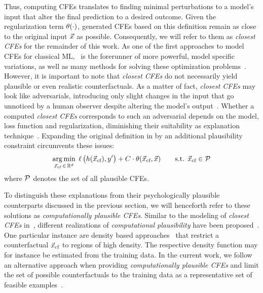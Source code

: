 Thus, computing \glspl{CFE} translates to finding minimal perturbations to a model's input that alter the final prediction to a desired outcome. Given the regularization term $\operatorname*{{\theta}}(\cdot)$, generated \glspl{CFE} based on this definition remain as close to the original input $\vec{x}$ as possible. Consequently, we will refer to them as \textit{closest \glspl{CFE}} for the remainder of this work.
As one of the first approaches to model \glspl{CFE} for classical \gls{ML},~ is the 
forerunner of more powerful, model specific variations, as well as many methods for solving these optimization problems~\citep{verma_counterfactual_2020,artelt_computation_2019,karimi_survey_2020}.
However, it is important to note that \textit{closest \glspl{CFE}} do not necessarily yield plausible or even realistic counterfactuals.
As a matter of fact, \textit{closest \glspl{CFE}} may look like adversarials, introducing only slight changes in the input that go unnoticed by a human observer despite altering the model's output~\citep{papernot_practical_2017}. 
Whether a computed \textit{closest \glspl{CFE}} corresponds to such an adversarial depends on the model, loss function and regularization, diminishing their suitability as explanation technique~\citep{laugel_issues_2019}.
Expanding the original definition in  by an additional plausibility constraint circumvents these issues:
\begin{equation}
\begin{split}
\underset{{\vec{x}_{\text{cf}}} \,\in\, \mathbb{R}^d}{\arg\min}\; \operatorname*{{\ell}}\big(h({\vec{x}_{\text{cf}}}), y'\big) + C \cdot \operatorname*{{\theta}}({\vec{x}_{\text{cf}}}, \vec{x}) \quad\quad \text{s.t. } {\vec{x}_{\text{cf}}} \in \mathcal{P}
\end{split}
\end{equation}
where $\mathcal{P}$ denotes the set of all plausible \glspl{CFE}.

To distinguish these explanations from their psychologically plausible counterparts discussed in the previous section, we will henceforth refer to these solutions as \textit{computationally plausible \glspl{CFE}}.
Similar to the modeling of \textit{closest \glspl{CFE}} in~, different realizations of \textit{computational plausibility} have been proposed~\citep{looveren_interpretable_2019,poyiadzi_face_2019,artelt_convex_2020}. 
One particular instance are density based approaches~\citep{artelt_convex_2020} that restrict a counterfactual ${\vec{x}_{\text{cf}}}$ to regions of high density. 
The respective density function may for instance be estimated from the training data.
In the current work, we follow an alternative approach when providing \textit{computationally plausible \glspl{CFE}} and limit the set of possible counterfactuals to the training data as a representative set of feasible examples~\citep{poyiadzi_face_2019}.


